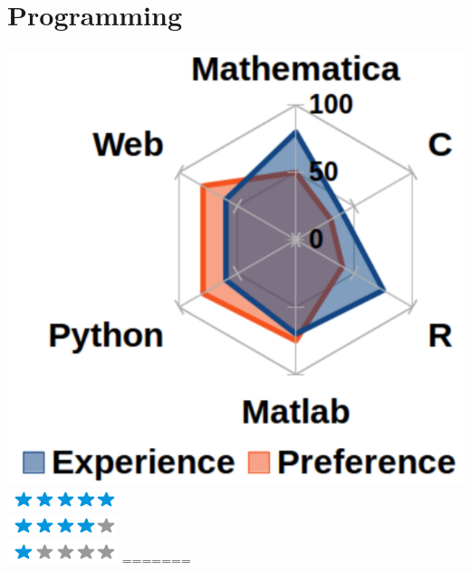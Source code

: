 \documentclass{article}
\begin{document}
\begin{minipage}[t]{0.27\textwidth}
    \section*{\fontsize{18pt}{24pt}\selectfont \color{pblue} Programming}
	\vspace{-2mm}
	\includegraphics[scale=0.3]{../img/programming.pdf}
	\textbf{\LARGE \faLinux}\includegraphics[scale=0.50]{../img/5stars.png}\\
	\textbf{\LARGE \faWindows}\includegraphics[scale=0.50]{../img/4stars.png}\\
	\textbf{\LARGE \faApple}\includegraphics[scale=0.50]{../img/1stars.png}
=======

\end{minipage}
\end{document}
